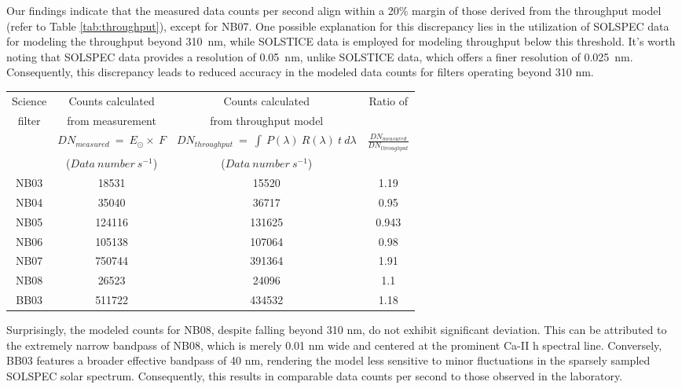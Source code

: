 Our findings indicate that the measured data counts per second align within a 20\% margin of those derived from the throughput model (refer to Table \ref{tab:throughput}), except for NB07. One possible explanation for this discrepancy lies in the utilization of SOLSPEC data for modeling the throughput beyond 310~nm, while SOLSTICE data is employed for modeling throughput below this threshold. It's worth noting that SOLSPEC data provides a resolution of 0.05~nm, unlike SOLSTICE data, which offers a finer resolution of 0.025~nm. Consequently, this discrepancy leads to reduced accuracy in the modeled data counts for filters operating beyond 310 nm.

\begin{table*}[ht]
\begin{center}
\begin{tabular}{||c|c|c|c||}
\hline
Science & Counts calculated & Counts calculated & Ratio of \\
filter & from measurement & from throughput model &  \\
 & $DN_{measured}~=~E_{\odot}\times~F$ & $DN_{throughput}~=~\int~P(\lambda)~R(\lambda)~t~d\lambda$ & $\frac{DN_{measured}}{DN_{throughput}}$\\
 & ($Data~number~s^{-1}$) & ($Data~number~s^{-1}$) & \\
\hline
NB03 & 18531 & 15520 & 1.19 \\
NB04 & 35040 & 36717 & 0.95 \\
NB05 & 124116 & 131625 & 0.943 \\
NB06 & 105138 & 107064 & 0.98 \\
NB07 & 750744 & 391364 & 1.91 \\
NB08 & 26523 & 24096 & 1.1 \\
BB03 & 511722 & 434532 & 1.18 \\
\hline

\end{tabular}
\end{center}
\caption{Comparison of the data numbers derived from throughput model (using SOLSTICE and SOLSPEC data) with the data numbers inferred from the measurements.} 
\label{tab:throughput}
\end{table*}

Surprisingly, the modeled counts for NB08, despite falling beyond 310 nm, do not exhibit significant deviation. This can be attributed to the extremely narrow bandpass of NB08, which is merely 0.01 nm wide and centered at the prominent Ca-II h spectral line. Conversely, BB03 features a broader effective bandpass of 40 nm, rendering the model less sensitive to minor fluctuations in the sparsely sampled SOLSPEC solar spectrum. Consequently, this results in comparable data counts per second to those observed in the laboratory.

